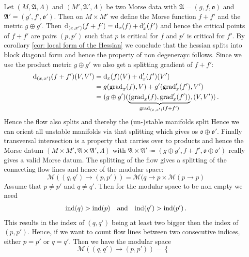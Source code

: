 \begin{definition}\label{def: Definition produce Morse datum}
	Let $(M,\mathfrak{A},\Lambda)$ and $(M',\mathfrak{A}',\Lambda)$ be two Morse data with $\mathfrak{A}=(g,f,\mathfrak{o})$ and $ \mathfrak{A}'=(g',f',\mathfrak{o}')$. Then on $M\times M'$ we define the Morse function $f+f'$ and the metric $g\oplus g'$. Then $\mathop{}\!\mathrm{d}_{(x,x')}(f+f')=\mathop{}\!\mathrm{d}_x(f)+\mathop{}\!\mathrm{d}_x'(f')$ and hence the critical points of $f+f'$ are pairs $(p,p')$ such that $p$ is critical for $f$ and $p'$ is critical for $f'$. By corollary \ref{cor: local form of the Hessian} we conclude that the hessian splits into block diagonal form and hence the property of non degenerayc follows. Since we use the product metric $g\oplus g'$ we also get a splitting gradient of $f+f'$: 
	\begin{align*}
		\mathop{}\!\mathrm{d}_{(x,x')}(f+f')(V,V')
		&=\mathop{}\!\mathrm{d}_x(f)(V)+\mathop{}\!\mathrm{d}_x'(f')(V')\\
		&=g(\mathrm{grad}_x(f),V)+g'(\mathrm{grad}_{x}'(f'),V')\\
		&=(g\oplus g')(\underbrace{(\mathrm{grad}_x(f),\mathrm{grad}_{x}'(f'))}_{\mathrm{grad}_{(x,x')}(f+f')},(V,V'))\,.
	\end{align*} Hence the flow also splits and thereby the (un-)stable manifolds split Hence we can orient all unstable manifolds via that splitting which gives os $\mathfrak{o}\oplus \mathfrak{o}'$. Finally transversal intersection is a property that carries over to products and hence the Morse datum $(M\times M',\mathfrak{A}\times \mathfrak{A}',\Lambda)$ with $\mathfrak{A}\times \mathfrak{A}'\coloneq (g\oplus g',f+f',\mathfrak{o}\oplus \mathfrak{o}')$ really gives a valid Morse datum.
	The splitting of the flow gives a splitting of the connecting flow lines and hence of the mudular space: 
	\begin{equation*}
		\mathcal{M}\left((q,q')\to (p,p')\right)=\mathcal{M}(q\to p\times \mathcal{M}(p\to p)
	\end{equation*} Assume that $p\neq p'$ and $q\neq q'$. Then for the modular space to be non empty we need 
	\begin{equation*}
		\mathrm{ind}(q)>\mathrm{ind}(p) \quad \text{and}\quad \mathrm{ind}(q')>\mathrm{ind}(p')\,.
	\end{equation*} This results in the index of $(q,q')$ being at least two bigger then the index of $(p,p')$. Hence, if we want to count flow lines between two consecutive indices, either $p=p'$ or $q=q'$. Then we have the modular space
	\begin{equation*}
		\mathcal{M}\left((q,q')\to (p,p')\right)=\begin{cases}

\end{cases}
\end{equation*}
\end{definition}
